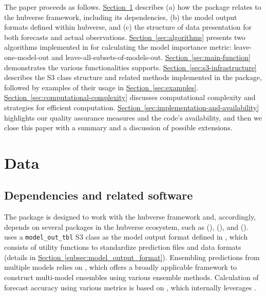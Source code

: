 \documentclass[
  article,
  shortnames,
  notitle]{jss}
\begin{document}
The paper proceeds as follows.
\hyperref[sec:data]{Section~\ref{sec:data}} describes (a) how the
 package relates to the hubverse framework,
including its dependencies, (b) the model output formats defined within
hubverse, and (c) the structure of data presentation for both forecasts
and actual observations.
\hyperref[sec:algorithms]{Section~\ref{sec:algorithms}} presents two
algorithms implemented in  for calculating the
model importance metric: leave-one-model-out and
leave-all-subsets-of-models-out.
\hyperref[sec:main-function]{Section~\ref{sec:main-function}}
demonstrates the various functionalities  supports.
\hyperref[sec:s3-infrastructure]{Section~\ref{sec:s3-infrastructure}}
describes the S3 class structure and related methods implemented in the
package, followed by examples of their usage in
\hyperref[sec:examples]{Section~\ref{sec:examples}}.
\hyperref[sec:computational-complexity]{Section~\ref{sec:computational-complexity}}
discusses computational complexity and strategies for efficient
computation.
\hyperref[sec:implementation-and-availability]{Section~\ref{sec:implementation-and-availability}}
highlights our quality assurance measures and the code's availability,
and then we close this paper with a summary and a discussion of possible
extensions.

\section{Data}\label{sec:data}

\subsection{Dependencies and related software}\label{subsec:dependences}

The  package is designed to work with the hubverse
framework and, accordingly, depends on several packages in the hubverse
ecosystem, such as  (\citet{Rpackage-hubUtils}),
 (\citet{Rpackage-hubEnsembles}), and 
(\citet{Rpackage-hubEvals}).  uses a
\texttt{model\_out\_tbl} S3 class as the model output format defined in
, which consists of utility functions to standardize
prediction files and data formats (details in
\hyperref[subsec:model_output_format]{Section~\ref{subsec:model_output_format}}).
Ensembling predictions from multiple models relies on
, which offers a broadly applicable framework to
construct multi-model ensembles using various ensemble methods.
Calculation of forecast accuracy using various metrics is based on
, which internally leverages .
\end{document}
